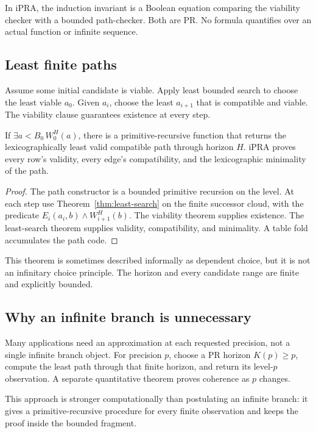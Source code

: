 In iPRA, the induction invariant is a Boolean equation comparing the viability
checker with a bounded path-checker.  Both are PR.  No formula quantifies over
an actual function or infinite sequence.

\subsection{Least finite paths}

Assume some initial candidate is viable.  Apply least bounded search to choose
the least viable \(a_0\).  Given \(a_i\), choose the least \(a_{i+1}\) that is
compatible and viable.  The viability clause guarantees existence at every
step.

\begin{theorem}
\label{thm:finite-choice}
If \(\exists a<B_0\,W_0^H(a)\), there is a primitive-recursive function that
returns the lexicographically least valid compatible path through horizon
\(H\).  iPRA proves every row's validity, every edge's compatibility, and the
lexicographic minimality of the path.
\end{theorem}

\begin{proof}
The path constructor is a bounded primitive recursion on the level.  At each
step use Theorem~\ref{thm:least-search} on the finite successor cloud, with the
predicate \(E_i(a_i,b)\wedge W_{i+1}^H(b)\).  The viability theorem supplies
existence.  The least-search theorem supplies validity, compatibility, and
minimality.  A table fold accumulates the path code.
\end{proof}

This theorem is sometimes described informally as dependent choice, but it is
not an infinitary choice principle.  The horizon and every candidate range are
finite and explicitly bounded.

\subsection{Why an infinite branch is unnecessary}

Many applications need an approximation at each requested precision, not a
single infinite branch object.  For precision \(p\), choose a PR horizon
\(K(p)\geq p\), compute the least path through that finite horizon, and return
its level-\(p\) observation.  A separate quantitative theorem proves coherence
as \(p\) changes.

This approach is stronger computationally than postulating an infinite branch:
it gives a primitive-recursive procedure for every finite observation and
keeps the proof inside the bounded fragment.

